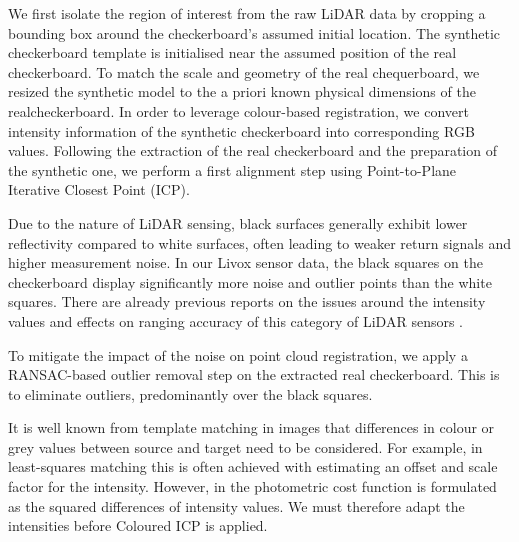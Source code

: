 We first isolate the region of interest from the raw LiDAR data by cropping a bounding box around the checkerboard's assumed initial location. The synthetic checkerboard template is initialised near the assumed position of the real checkerboard. To match the scale and geometry of the real chequerboard, we resized the synthetic model to the a priori known physical dimensions of the realcheckerboard. In order to leverage colour-based registration, we convert intensity information of the synthetic checkerboard into corresponding RGB values. Following the extraction of the real checkerboard and the preparation of the synthetic one, we perform a first alignment step using Point-to-Plane Iterative Closest Point (ICP). 

Due to the nature of LiDAR sensing, black surfaces generally exhibit lower reflectivity compared to white surfaces, often leading to weaker return signals and higher measurement noise. In our Livox sensor data, the black squares on the checkerboard display significantly more noise and outlier points than the white squares. There are already previous reports on the issues around the intensity values and effects on ranging accuracy of this category of LiDAR sensors \citep{zhang_investigation_2023}.

To mitigate the impact of the noise on point cloud registration, we apply a RANSAC-based outlier removal step on the extracted real checkerboard. This is to eliminate outliers, predominantly over the black squares. 

It is well known from template matching in images that differences in colour or grey values between source and target need to be considered. For example, in least-squares matching this is often achieved with estimating an offset and scale factor for the intensity. However, in \citep{park_colored_2017} the photometric cost function is formulated as the squared differences of intensity values. We must therefore adapt the intensities before Coloured ICP is applied.



